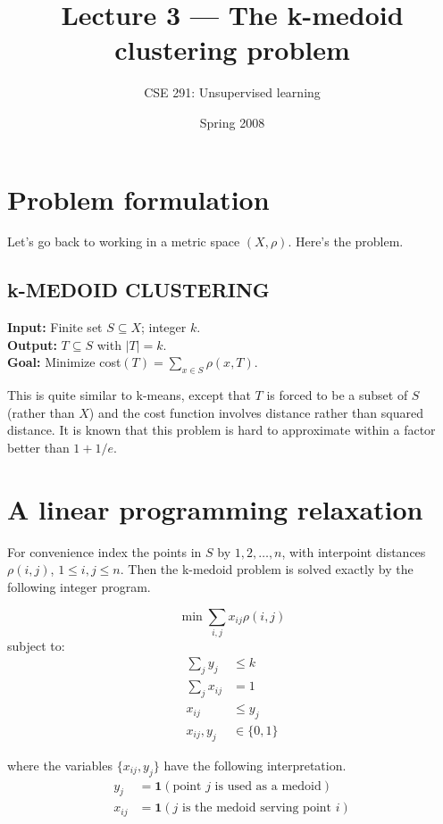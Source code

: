 \documentclass{article}
\title{Lecture 3 --- The k-medoid clustering problem}
\author{CSE 291: Unsupervised learning}
\date{Spring 2008}
\begin{document}
\maketitle

\section{Problem formulation}

Let's go back to working in a metric space $(X, \rho)$. Here's the problem.

\subsection*{k-MEDOID CLUSTERING}
\textbf{Input:} Finite set $S \subseteq X$; integer $k$. \\
\textbf{Output:} $T \subseteq S$ with $|T| = k$. \\
\textbf{Goal:} Minimize cost$(T) = \sum_{x \in S} \rho(x, T)$.

This is quite similar to k-means, except that $T$ is forced to be a subset of $S$ (rather than $X$) and the cost function involves distance rather than squared distance. It is known that this problem is hard to approximate within a factor better than $1+1/e$.

\section{A linear programming relaxation}

For convenience index the points in $S$ by $1, 2, \dots, n$, with interpoint distances $\rho(i, j)$, $1 \le i, j \le n$. Then the k-medoid problem is solved exactly by the following integer program.

\begin{equation*}
\min \sum_{i,j} x_{ij} \rho(i, j)
\end{equation*}
subject to:
\begin{align*}
\sum_j y_j &\le k \\
\sum_j x_{ij} &= 1 \\
x_{ij} &\le y_j \\
x_{ij}, y_j &\in \{0,1\}
\end{align*}

where the variables $\{x_{ij}, y_j\}$ have the following interpretation.
\begin{align*}
y_j &= \mathbf{1}(\text{point } j \text{ is used as a medoid}) \\
x_{ij} &= \mathbf{1}(j \text{ is the medoid serving point } i)
\end{align*}
\end{document}
